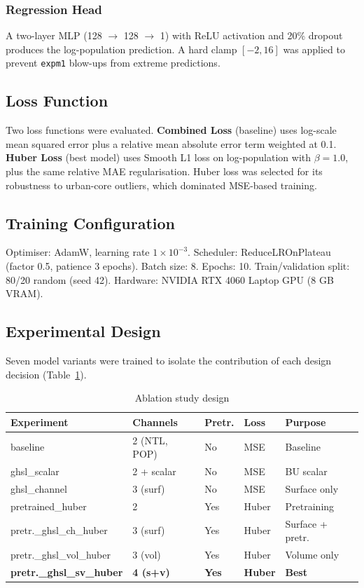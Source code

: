 \documentclass[conference]{IEEEtran}
\begin{document}
\subsubsection{Regression Head}

A two-layer MLP (128 $\rightarrow$ 128 $\rightarrow$ 1) with ReLU activation and 20\% dropout produces the log-population prediction. A hard clamp $[-2, 16]$ was applied to prevent \texttt{expm1} blow-ups from extreme predictions.

\subsection{Loss Function}
\label{subsec:loss}

Two loss functions were evaluated. \textbf{Combined Loss} (baseline) uses log-scale mean squared error plus a relative mean absolute error term weighted at 0.1. \textbf{Huber Loss} (best model) uses Smooth L1 loss on log-population with $\beta = 1.0$, plus the same relative MAE regularisation. Huber loss was selected for its robustness to urban-core outliers, which dominated MSE-based training.

\subsection{Training Configuration}
\label{subsec:training}

Optimiser: AdamW, learning rate $1 \times 10^{-3}$. Scheduler: ReduceLROnPlateau (factor 0.5, patience 3 epochs). Batch size: 8. Epochs: 10. Train/validation split: 80/20 random (seed 42). Hardware: NVIDIA RTX 4060 Laptop GPU (8 GB VRAM).

\subsection{Experimental Design}
\label{subsec:experiments}

Seven model variants were trained to isolate the contribution of each design decision (Table~\ref{tab:ablation_design}).

\begin{table}[htbp]
\caption{Ablation study design}
\label{tab:ablation_design}
\centering
\begin{tabular}{@{}lllll@{}}
\toprule
\textbf{Experiment} & \textbf{Channels} & \textbf{Pretr.} & \textbf{Loss} & \textbf{Purpose} \\
\midrule
baseline & 2 (NTL, POP) & No & MSE & Baseline \\
ghsl\_scalar & 2 + scalar & No & MSE & BU scalar \\
ghsl\_channel & 3 (surf) & No & MSE & Surface only \\
pretrained\_huber & 2 & Yes & Huber & Pretraining \\
pretr.\_ghsl\_ch\_huber & 3 (surf) & Yes & Huber & Surface + pretr. \\
pretr.\_ghsl\_vol\_huber & 3 (vol) & Yes & Huber & Volume only \\
\textbf{pretr.\_ghsl\_sv\_huber} & \textbf{4 (s+v)} & \textbf{Yes} & \textbf{Huber} & \textbf{Best} \\
\bottomrule
\end{tabular}
\end{table}
\end{document}
